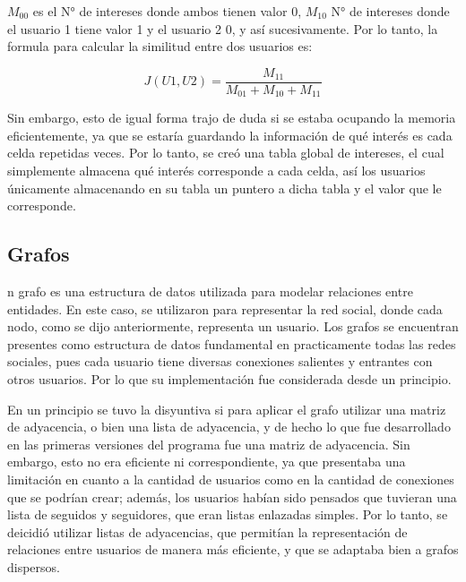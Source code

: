 \documentclass[9pt,letterpaper,onecolumn]{rho-class/rho}
\begin{document}
    $M_{00}$ es el N° de intereses donde ambos tienen valor 0, $M_{10}$ N° de intereses donde el usuario 1 tiene valor 1 y el usuario 2 0, y así sucesivamente. Por lo tanto, la formula para calcular la similitud entre dos usuarios es:

    \begin{equation}
        \label{eq:jaccard}
        J(U1,U2) = \frac{M_{11}}{M_{01}+M_{10}+M_{11}}
    \end{equation}
	
	Sin embargo, esto de igual forma trajo de duda si se estaba ocupando la memoria eficientemente, ya que se estaría guardando la información de qué interés es cada celda repetidas veces. Por lo tanto, se creó una tabla global de intereses, el cual simplemente almacena qué interés corresponde a cada celda, así los usuarios únicamente almacenando en su tabla un puntero a dicha tabla y el valor que le corresponde.

\subsection{Grafos}
n grafo es una estructura de datos utilizada para modelar relaciones entre entidades. En este caso, se utilizaron para representar la red social, donde cada nodo, como se dijo anteriormente, representa un usuario. Los grafos se encuentran presentes como estructura de datos fundamental en practicamente todas las redes sociales, pues cada usuario tiene diversas conexiones salientes y entrantes con otros usuarios. Por lo que su implementación fue considerada desde un principio.

\vspace{0.5cm}

En un principio se tuvo la disyuntiva si para aplicar el grafo utilizar una matriz de adyacencia, o bien una lista de adyacencia, y de hecho lo que fue desarrollado en las primeras versiones del programa fue una matriz de adyacencia. Sin embargo, esto no era eficiente ni correspondiente, ya que presentaba una limitación en cuanto a la cantidad de usuarios como en la cantidad de conexiones que se podrían crear; además, los usuarios habían sido pensados que tuvieran una lista de seguidos y seguidores, que eran listas enlazadas simples. Por lo tanto, se deicidió utilizar listas de adyacencias, que permitían la representación de relaciones entre usuarios de manera más eficiente, y que se adaptaba bien a grafos dispersos.
\end{document}
